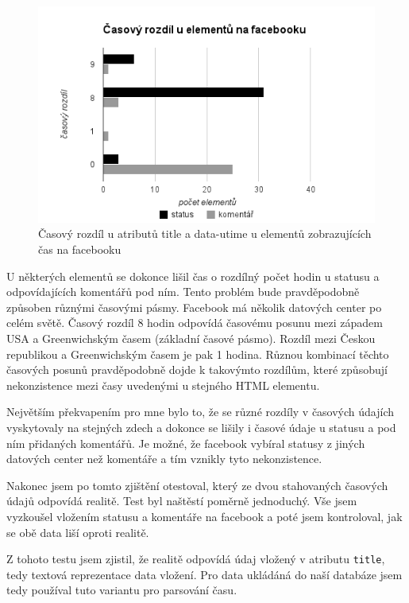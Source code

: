 \documentclass[thesis=M,czech]{FITthesis}[2013/05/10]
\begin{document}
\begin{figure}[h]
\begin{center}
\includegraphics[width=5in]{figures/timeDifference.png}
\caption{Časový rozdíl u atributů title a data-utime u elementů zobrazujících čas na facebooku}
\label{fig:timeDifference}
\end{center}
\end{figure}

U některých elementů se dokonce lišil čas o rozdílný počet hodin u statusu a odpovídajících komentářů pod ním. Tento problém bude pravděpodobně způsoben různými časovými pásmy. Facebook má několik datových center po  celém světě. Časový rozdíl 8 hodin odpovídá časovému posunu mezi západem USA a Greenwichským časem (základní časové pásmo). Rozdíl mezi Českou republikou a Greenwichským časem je pak 1 hodina. Různou kombinací těchto časových posunů pravděpodobně dojde k takovýmto rozdílům, které způsobují nekonzistence mezi časy uvedenými u stejného HTML elementu. 

Největším překvapením pro mne bylo to, že se různé rozdíly v časových údajích vyskytovaly na stejných zdech a dokonce se lišily i časové údaje u statusu a pod ním přidaných komentářů.  Je možné, že facebook vybíral statusy z jiných datových center než komentáře a tím vznikly tyto nekonzistence.

Nakonec jsem po tomto zjištění otestoval, který ze dvou stahovaných časových údajů odpovídá realitě. Test byl naštěstí poměrně jednoduchý. Vše jsem vyzkoušel vložením statusu a komentáře na facebook a poté jsem kontroloval, jak se obě data liší oproti realitě. 

Z tohoto testu jsem zjistil, že realitě odpovídá údaj vložený v atributu \verb|title|, tedy textová reprezentace data vložení. Pro data ukládáná do naší databáze jsem tedy používal tuto variantu pro parsování času.
\end{document}

